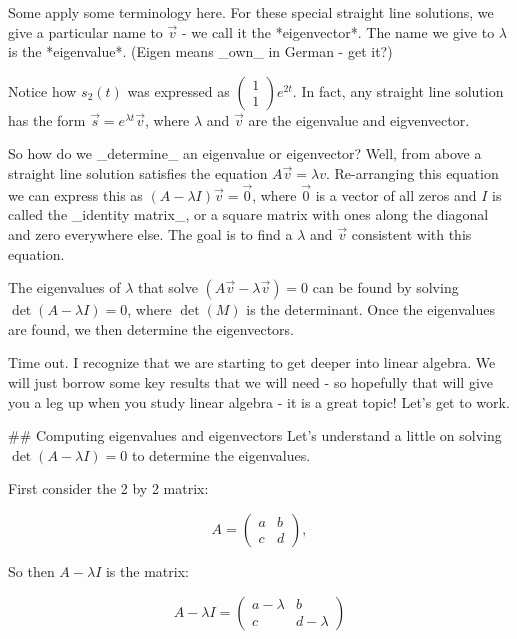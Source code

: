\documentclass[
]{book}
\theoremstyle{definition}
\theoremstyle{definition}
\theoremstyle{definition}
\theoremstyle{remark}
\begin{document}
Some apply some terminology here. For these special straight line solutions, we give a particular name to $\vec{v}$ - we call it the *eigenvector*.  The name we give to $\lambda$ is the *eigenvalue*.  (Eigen means _own_ in German - get it?)

Notice how $s_{2}(t)$ was expressed as $\begin{pmatrix} 1 \\ 1\end{pmatrix}e^{2t}$.  In fact, any straight line solution has the form $\displaystyle \vec{s} = e^{\lambda t} \vec{v}$, where $\lambda$ and $\vec{v}$ are the eigenvalue and eigvenvector.


So how do we _determine_ an eigenvalue or eigenvector?  Well, from above a straight line solution satisfies the equation $A\vec{v} = \lambda{v}$.  Re-arranging this equation we can express this as $(A - \lambda I) \vec{v} = \vec{0}$, where $\vec{0}$ is a vector of all zeros and $I$ is called the _identity matrix_, or a square matrix with ones along the diagonal and zero everywhere else.  The goal is to find a $\lambda$ and $\vec{v}$ consistent with this equation.

The eigenvalues of $\lambda$ that solve $( A \vec{v} - \lambda \vec{v} ) = 0$ can be found by solving $\det (A - \lambda I ) =0$, where $\det(M)$ is the determinant. Once the eigenvalues are found, we then determine the eigenvectors.

Time out.  I recognize that we are starting to get deeper into linear algebra. We will just borrow some key results that we will need - so hopefully that will give you a leg up when you study linear algebra - it is a great topic! Let's get to work.


## Computing eigenvalues and eigenvectors
Let's understand a little on solving $\det (A - \lambda I ) =0$ to determine the eigenvalues.

First consider the 2 by 2 matrix:

\begin{equation*}
A = \begin{pmatrix} a & b \\ c & d \end{pmatrix},
\end{equation*}

So then $A - \lambda I$ is the matrix:

\begin{equation*}
A - \lambda I=\begin{pmatrix} a - \lambda & b \\ c & d-\lambda \end{pmatrix}
\end{equation*}
\end{document}
